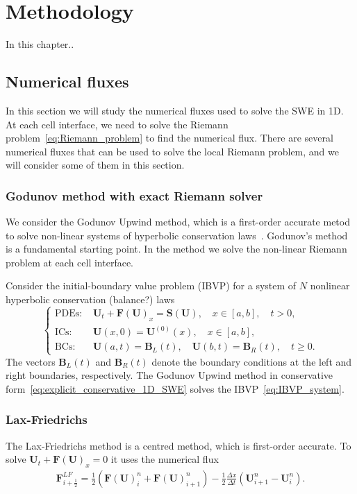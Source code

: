 \chapter{Methodology}
In this chapter..

\section{Numerical fluxes}
In this section we will study the numerical fluxes used to solve the SWE in 1D.
At each cell interface, we need to solve the Riemann problem~\eqref{eq:Riemann_problem} to find the numerical flux.
There are several numerical fluxes that can be used to solve the local Riemann problem, and we will consider some of them in this section.


\subsection{Godunov method with exact Riemann solver}
We consider the Godunov Upwind method, which is a first-order accurate metod to solve non-linear systems of hyperbolic conservation laws~\cite{Toro2024}.
Godunov's method is a fundamental starting point.
In the method we solve the non-linear Riemann problem at each cell interface. 

Consider the initial-boundary value problem (IBVP) for a system of $N$ nonlinear hyperbolic conservation (balance?) laws     
\begin{equation}\label{eq:IBVP_system}
    \begin{cases}
    \text{PDEs: }    &\mathbf{U}_t + \mathbf{F(U)}_x = \mathbf{S(U)}, \quad x \in [a, b], \quad t > 0, \\
    \text{ICs: }    &\mathbf{U}(x,0) = \mathbf{U}^{(0)}(x), \quad x \in [a,b], \\
    \text{BCs: }    &\mathbf{U}(a,t) = \mathbf{B}_{L}(t), \quad \mathbf{U}(b,t) = \mathbf{B}_{R}(t), \quad t \geq 0.
    \end{cases}
\end{equation}
The vectors $\mathbf{B}_L (t)$ and $\mathbf{B}_R (t)$ denote the boundary conditions at the left and right boundaries, respectively.
The Godunov Upwind method in conservative form~\eqref{eq:explicit_conservative_1D_SWE} solves the IBVP~\eqref{eq:IBVP_system}.


\subsection{Lax-Friedrichs}
The Lax-Friedrichs method is a centred method, which is first-order accurate.
To solve $\mathbf{U}_t + \mathbf{F(U)}_x = 0$ it uses the numerical flux
\begin{align*}
    \mathbf{F}_{i+\frac{1}{2}}^{LF} = \frac{1}{2} \left( {\mathbf{F}(\mathbf{U})}_{i}^n + {\mathbf{F}(\mathbf{U})}_{i+1}^n \right) - \frac{1}{2} \frac{\Delta x}{\Delta t} \left( \mathbf{U}_{i+1}^n - \mathbf{U}_i^n \right).
\end{align*}

